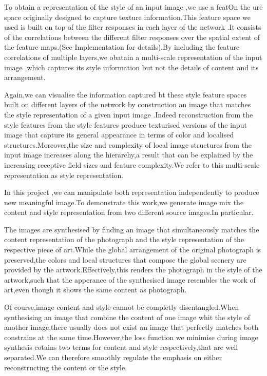 \documentclass[10pt,a4paper]{article}
\begin{document}
	
	To obtain a representation of the style of an input image ,we use a featOn the ure
	space originally designed to capture texture information.This feature space we used is built on top of the filter responses in each layer of the network
	.It consists of the correlations between the different filter responses over the spatial extent of the feature maps.(See Implementation for details).By including the feature correlations of multiple layers,we obatain a multi-scale representation of the input image ,which captures its style information but not the details of content and its arrangement.
	
	Again,we can visualise the information captured bt these style feature spaces built on different layers of the network by construction an image that matches the style representation of a given input image .Indeed reconstruction from the style features from the style features produce 
	texturised versions of the input image that capture its general appearance in 
	terms of color and localised structures.Moreover,the size and complexity of local image structures from the input image increases along the hierarchy,a result that can be explained by the increasing receptive field sizes and feature complexity.We refer to this multi-scale representation as style representation.
	
	In this project ,we can manipulate both representation independently to produce new meaningful image.To demonstrate this work,we generate image mix 
	the content and style representation from two different source images.In particular.
	
	The images are synthesised by finding an image that simultaneously matches the
	content representation of the photograph and the style representation of the
	respective piece of art.While the global arrangement of the original photograph is preserved,the colors and local structures that compose the global scenery are provided by the artwork.Effectively,this renders the photograph in the style of the artwork,such that the apperance of the synthesised image resembles the work of art,even though it shows the same content as photograph.
	
	Of course,image content and style cannot be completly disentangled.When synthesising an image that combine 
	the content of one image whit the style of another image,there usually does not exist an image that perfectly 
	matches both constrains at the same time.However,the loss function we minimise during image synthesis cotains
	two terms for content and style respectively,that are well separated.We can therefore smoothly regulate 
	the emphasis on either reconstructing the content or the style.
	
\end{document}

